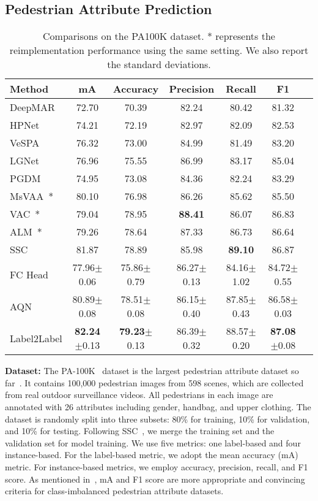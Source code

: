 \documentclass[runningheads]{llncs}
\begin{document}
\subsection{Pedestrian Attribute Prediction}

\begin{table}[t]
  \caption{
    Comparisons on the PA100K dataset. * represents the reimplementation performance using the same setting. We also report the standard deviations.
}
\label{table:result:pa100k}
\renewcommand\tabcolsep{4pt}
\centering
\begin{tabular}{lcccccc}
\toprule
Method  & mA & Accuracy & Precision & Recall & F1 \\
\midrule
DeepMAR~\cite{li2015multi} & 72.70 & 70.39 & 82.24 & 80.42 & 81.32 \\
HPNet~\cite{liu2017hydraplus} & 74.21 & 72.19 & 82.97 & 82.09 & 82.53 \\
VeSPA~\cite{sarfraz2017deep} & 76.32& 73.00& 84.99& 81.49& 83.20 \\
LGNet~\cite{liu2018localization} &76.96 &75.55& 86.99& 83.17& 85.04 \\
PGDM~\cite{li2018pose} & 74.95 & 73.08 & 84.36 & 82.24  & 83.29 \\
\midrule
MsVAA~\cite{sarafianos2018deep}* & 80.10 & 76.98 & 86.26 & 85.62 & 85.50 \\
VAC~\cite{guo2019visual}* & 79.04 & 78.95 & \textbf{88.41} & 86.07 & 86.83 \\
ALM~\cite{tang2019improving}* &  79.26  & 78.64  & 87.33 & 86.73 & 86.64 \\
SSC~\cite{jia2021spatial} & 81.87 & 78.89 & 85.98  & \textbf{89.10} & 86.87 \\
\midrule
FC Head & 77.96$\pm$0.06 & 75.86$\pm$0.79 & 86.27$\pm$0.13 & 84.16$\pm$1.02 & 84.72$\pm$0.55 \\
AQN & 80.89$\pm$0.08 & 78.51$\pm$0.08 & 86.15$\pm$0.40 & 87.85$\pm$0.43 & 86.58$\pm$0.03 \\
Label2Label & \textbf{82.24}$\pm$0.13 & \textbf{79.23}$\pm$0.13 & 86.39$\pm$0.32 & 88.57$\pm$0.20 & \textbf{87.08}$\pm$0.08 \\
\bottomrule
\end{tabular}
\end{table}

\textbf{Dataset:} The PA-100K~\cite{liu2017hydraplus} dataset is
the largest pedestrian attribute dataset so far~\cite{tang2019improving}. It contains 100,000 pedestrian images from 598 scenes, which are collected from real outdoor surveillance videos. All pedestrians in each image are annotated with 26 attributes including gender, handbag, and upper clothing. The dataset is randomly split into three subsets: 80\% for training, 10\% for validation, and 10\% for testing. Following SSC~\cite{jia2021spatial}, we merge the training set and the validation set for model training.
We use five metrics: one label-based and four instance-based. For the label-based metric, we adopt the mean accuracy (mA) metric.
For instance-based metrics, we employ accuracy, precision, recall, and F1 score. As mentioned in~\cite{tang2019improving}, mA and F1 score are more appropriate and convincing criteria for class-imbalanced pedestrian attribute datasets. 
\end{document}

